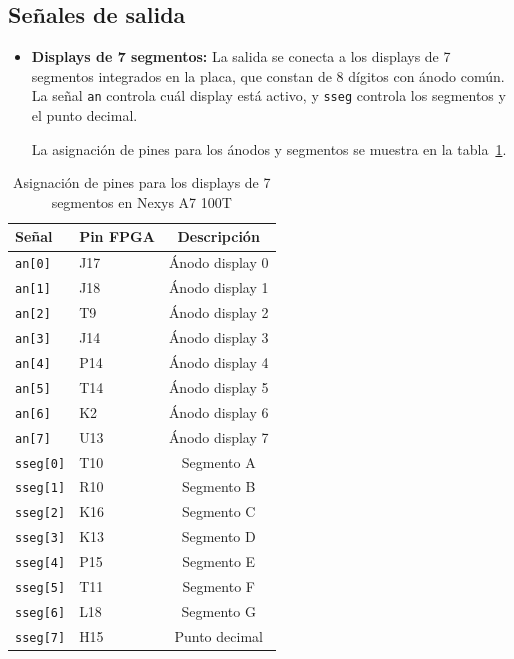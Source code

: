\documentclass[a4paper,12pt]{article}
\begin{document}
\subsection{Señales de salida}

\begin{itemize}
  \item \textbf{Displays de 7 segmentos:}  
  La salida se conecta a los displays de 7 segmentos integrados en la placa, que constan de 8 dígitos con ánodo común.  
  La señal \texttt{an} controla cuál display está activo, y \texttt{sseg} controla los segmentos y el punto decimal.

  La asignación de pines para los ánodos y segmentos se muestra en la tabla~\ref{tab:display_pins}.
\end{itemize}

\begin{table}[H]
  \centering
  \begin{tabular}{llc}
    \toprule
    \textbf{Señal} & \textbf{Pin FPGA} & \textbf{Descripción} \\
    \midrule
    \texttt{an[0]} & J17  & Ánodo display 0 \\
    \texttt{an[1]} & J18  & Ánodo display 1 \\
    \texttt{an[2]} & T9  & Ánodo display 2 \\
    \texttt{an[3]} & J14  & Ánodo display 3 \\
    \texttt{an[4]} & P14  & Ánodo display 4 \\
    \texttt{an[5]} & T14  & Ánodo display 5 \\
    \texttt{an[6]} & K2  & Ánodo display 6 \\
    \texttt{an[7]} & U13  & Ánodo display 7 \\
    \midrule
    \texttt{sseg[0]} & T10  & Segmento A \\
    \texttt{sseg[1]} & R10  & Segmento B \\
    \texttt{sseg[2]} & K16  & Segmento C \\
    \texttt{sseg[3]} & K13  & Segmento D \\
    \texttt{sseg[4]} & P15  & Segmento E \\
    \texttt{sseg[5]} & T11  & Segmento F \\
    \texttt{sseg[6]} & L18  & Segmento G \\
    \texttt{sseg[7]} & H15  & Punto decimal \\
    \bottomrule
  \end{tabular}
  \caption{Asignación de pines para los displays de 7 segmentos en Nexys A7 100T}
  \label{tab:display_pins}
\end{table}
\end{document}
